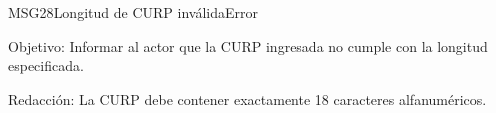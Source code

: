 \begin{mensaje}{MSG28}{Longitud de CURP inválida}{Error}
	\item [Objetivo:] Informar al actor que la CURP ingresada no cumple con la longitud especificada.
	\item[Redacción:] La CURP debe contener exactamente 18 caracteres alfanuméricos.
\end{mensaje}
